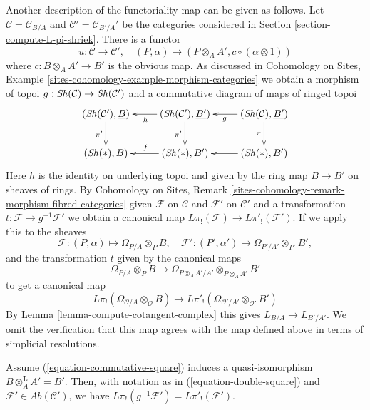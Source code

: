 \medskip\noindent
Another description of the functoriality map can be given as follows.
Let $\mathcal{C} = \mathcal{C}_{B/A}$ and $\mathcal{C}' = \mathcal{C}_{B'/A}'$
be the categories considered in Section \ref{section-compute-L-pi-shriek}.
There is a functor
$$
u : \mathcal{C} \longrightarrow \mathcal{C}',\quad
(P, \alpha) \longmapsto (P \otimes_A A', c \circ (\alpha \otimes 1))
$$
where $c : B \otimes_A A' \to B'$ is the obvious map. As discussed in
Cohomology on Sites, Example
\ref{sites-cohomology-example-morphism-categories}
we obtain a morphism of topoi $g : \mathop{\mathit{Sh}}\nolimits(\mathcal{C}) \to \mathop{\mathit{Sh}}\nolimits(\mathcal{C}')$
and a commutative diagram of maps of ringed topoi
\begin{equation}
\label{equation-double-square}
\vcenter{
\xymatrix{
(\Sh(\mathcal{C}'), \underline{B}) \ar[d]_{\pi'} &
(\Sh(\mathcal{C}'), \underline{B'}) \ar[d]_{\pi'} \ar[l]^h &
(\Sh(\mathcal{C}), \underline{B'}) \ar[d]_\pi \ar[l]^g \\
(\Sh(*), B) &
(\Sh(*), B') \ar[l]_f &
(\Sh(*), B') \ar[l]
}
}
\end{equation}
Here $h$ is the identity on underlying topoi and given by the ring map
$B \to B'$ on sheaves of rings. 
By Cohomology on Sites, Remark
\ref{sites-cohomology-remark-morphism-fibred-categories}
given $\mathcal{F}$ on $\mathcal{C}$ and $\mathcal{F}'$ on $\mathcal{C}'$
and a transformation $t : \mathcal{F} \to g^{-1}\mathcal{F}'$
we obtain a canonical map $L\pi_!(\mathcal{F}) \to L\pi'_!(\mathcal{F}')$.
If we apply this to the sheaves
$$
\mathcal{F} : (P, \alpha) \mapsto \Omega_{P/A} \otimes_P B,\quad
\mathcal{F}' : (P', \alpha') \mapsto \Omega_{P'/A'} \otimes_{P'} B',
$$
and the transformation $t$ given by the canonical maps
$$
\Omega_{P/A} \otimes_P B \longrightarrow
\Omega_{P \otimes_A A'/A'} \otimes_{P \otimes_A A'} B'
$$
to get a canonical map
$$
L\pi_!(\Omega_{\mathcal{O}/A} \otimes_\mathcal{O} \underline{B})
\longrightarrow
L\pi'_!(\Omega_{\mathcal{O}'/A'} \otimes_{\mathcal{O}'} \underline{B'})
$$
By Lemma \ref{lemma-compute-cotangent-complex} this gives
$L_{B/A} \to L_{B'/A'}$. We omit the verification that this map
agrees with the map defined above in terms of simplicial
resolutions.

\begin{lemma}
\label{lemma-flat-base-change}
Assume (\ref{equation-commutative-square}) induces a quasi-isomorphism
$B \otimes_A^\mathbf{L} A' = B'$. Then, with notation as in
(\ref{equation-double-square}) and
$\mathcal{F}' \in \textit{Ab}(\mathcal{C}')$,
we have $L\pi_!(g^{-1}\mathcal{F}') = L\pi'_!(\mathcal{F}')$.
\end{lemma}

